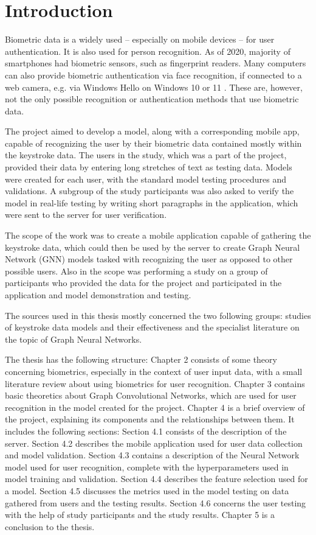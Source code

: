 
\chapter{Introduction}

Biometric data is a widely used -- especially on mobile devices -- for user authentication. It is also used for person recognition. As of 2020, majority of smartphones had biometric sensors, such as fingerprint readers\cite{statista_biometric_phones_2025}. Many computers can also provide biometric authentication via face recognition, if connected to a web camera, e.g. via Windows Hello on Windows 10 or 11 \cite{microsoft_windows_hello_2025}. These are, however, not the only possible recognition or authentication methods that use biometric data.

The project aimed to develop a model, along with a corresponding mobile app, capable of recognizing the user by their biometric data contained mostly within the keystroke data. The users in the study, which was a part of the project, provided their data by entering long stretches of text as testing data. Models were created for each user, with the standard model testing procedures and validations. A subgroup of the study participants was also asked to verify the model in real-life testing by writing short paragraphs in the application, which were sent to the server for user verification.

The scope of the work was to create a mobile application capable of gathering the keystroke data, which could then be used by the server to create Graph Neural Network (GNN) models tasked with recognizing the user as opposed to other possible users. Also in the scope was performing a study on a group of participants who provided the data for the project and participated in the application and model demonstration and testing.

The sources used in this thesis mostly concerned the two following groups: studies of keystroke data models and their effectiveness and the specialist literature on the topic of Graph Neural Networks.

The thesis has the following structure:
Chapter 2 consists of some theory concerning biometrics, especially in the context of user input data, with a small literature review about using biometrics for user recognition.
Chapter 3 contains basic theoretics about Graph Convolutional Networks, which are used for user recognition in the model created for the project.
Chapter 4 is a brief overview of the project, explaining its components and the relationships between them. It includes the following sections:
Section 4.1 consists of the description of the server.
Section 4.2 describes the mobile application used for user data collection and model validation.
Section 4.3 contains a description of the Neural Network model used for user recognition, complete with the hyperparameters used in model training and validation.
Section 4.4 describes the feature selection used for a model.
Section 4.5 discusses the metrics used in the model testing on data gathered from users and the testing results.
Section 4.6 concerns the user testing with the help of study participants and the study results.
Chapter 5 is a conclusion to the thesis.

